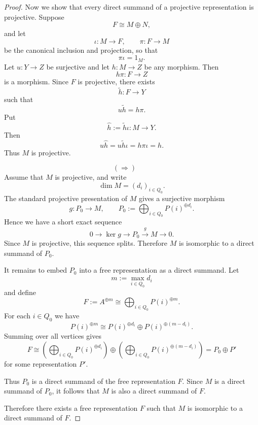 \documentclass[11pt, a4paper]{report}
\begin{document}
\begin{proof}
            Now we show that every direct summand of a projective representation is projective.
            Suppose
            \[
                F \cong M\oplus N,
            \]
            and let
            \[
                \iota\colon M\to F,
                \qquad
                \pi\colon F\to M
            \]
            be the canonical inclusion and projection, so that
            \[
                \pi\iota=1_M.
            \]
            Let $u\colon Y\to Z$ be surjective and let $h\colon M\to Z$ be any morphism.
            Then
            \[
                h\pi\colon F\to Z
            \]
            is a morphism. Since $F$ is projective, there exists
            \[
                \widetilde{h}\colon F\to Y
            \]
            such that
            \[
                u\widetilde{h}=h\pi.
            \]
            Put
            \[
                \widehat{h}:=\widetilde{h}\iota\colon M\to Y.
            \]
            Then
            \[
                u\widehat{h}
                =u\widetilde{h}\iota
                =h\pi\iota
                =h.
            \]
            Thus $M$ is projective.

            \[
                (\Longrightarrow)\qquad
            \]
            Assume that $M$ is projective, and write
            \[
                \dim M=(d_i)_{i\in Q_0}.
            \]
            The standard projective presentation of $M$ gives a surjective morphism
            \[
                g\colon P_0\to M,
                \qquad
                P_0:=\bigoplus_{i\in Q_0} P(i)^{\oplus d_i}.
            \]
            Hence we have a short exact sequence
            \[
                0\longrightarrow \ker g\longrightarrow P_0\xrightarrow{\,g\,} M\longrightarrow 0.
            \]
            Since $M$ is projective, this sequence splits. Therefore $M$ is isomorphic to a direct summand of $P_0$.

            It remains to embed $P_0$ into a free representation as a direct summand.
            Let
            \[
                m:=\max_{i\in Q_0} d_i
            \]
            and define
            \[
                F:=A^{\oplus m}
                \cong \bigoplus_{i\in Q_0} P(i)^{\oplus m}.
            \]
            For each $i\in Q_0$ we have
            \[
                P(i)^{\oplus m}
                \cong
                P(i)^{\oplus d_i}\oplus P(i)^{\oplus (m-d_i)}.
            \]
            Summing over all vertices gives
            \[
                F
                \cong
                \left(\bigoplus_{i\in Q_0} P(i)^{\oplus d_i}\right)
                \oplus
                \left(\bigoplus_{i\in Q_0} P(i)^{\oplus (m-d_i)}\right)
                =
                P_0\oplus P'
            \]
            for some representation $P'$.

            Thus $P_0$ is a direct summand of the free representation $F$. Since $M$ is a direct summand of $P_0$, it follows that $M$ is also a direct summand of $F$.

            Therefore there exists a free representation $F$ such that $M$ is isomorphic to a direct summand of $F$.
        \end{proof}
\end{document}
